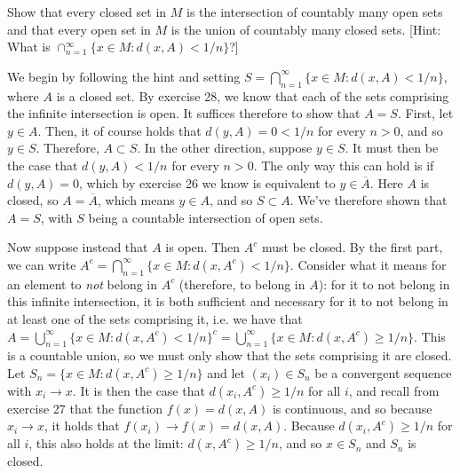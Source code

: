 \begin{exercise}{29}
    Show that every closed set in $M$ is the intersection of countably many open sets and that every open set in $M$ is the union of countably many closed sets.
    [Hint: What is $\cap_{n=1}^{\infty} \{x \in M : d(x, A) < 1/n\}$?]
\end{exercise}

\begin{solution}
    
    We begin by following the hint and setting $S = \bigcap_{n=1}^{\infty} \{x \in M : d(x, A) < 1/n\}$, where $A$ is a closed set.
    By exercise 28, we know that each of the sets comprising the infinite intersection is open.
    It suffices therefore to show that $A = S$.
    First, let $y \in A$.
    Then, it of course holds that $d(y, A) = 0 < 1/n$ for every $n > 0$, and so $y \in S$.
    Therefore, $A \subset S$.
    In the other direction, suppose $y \in S$.
    It must then be the case that $d(y, A) < 1/n$ for every $n > 0$.
    The only way this can hold is if $d(y, A) = 0$, which by exercise 26 we know is equivalent to $y \in \overline{A}$.
    Here $A$ is closed, so $A = \overline{A}$, which means $y \in A$, and so $S \subset A$.
    We've therefore shown that $A = S$, with $S$ being a countable intersection of open sets.

    Now suppose instead that $A$ is open.
    Then $A^c$ must be closed.
    By the first part, we can write $A^c = \bigcap_{n=1}^{\infty}\{x \in M : d(x, A^c) < 1/n \}$.
    Consider what it means for an element to \textit{not} belong in $A^c$ (therefore, to belong in $A$): for it to not belong in this infinite intersection, it is both sufficient and necessary for it to not belong in at least one of the sets comprising it, i.e. we have that $A = \bigcup_{n=1}^{\infty}\{x \in M : d(x, A^c) < 1/n\}^c = \bigcup_{n=1}^{\infty}\{x \in M : d(x, A^c) \geq 1/n\}$.
    This is a countable union, so we must only show that the sets comprising it are closed.
    Let $S_n = \{x \in M : d(x, A^c) \geq 1/n\}$ and let $(x_i) \in S_n$ be a convergent sequence with $x_i \rightarrow x$.
    It is then the case that $d(x_i, A^c) \geq 1/n$ for all $i$, and recall from exercise 27 that the function $f(x) = d(x, A)$ is continuous, and so because $x_i \rightarrow x$, it holds that $f(x_i) \rightarrow f(x) = d(x, A)$. Because $d(x_i, A^c) \geq 1/n$ for all $i$, this also holds at the limit: $d(x, A^c) \geq 1/n$, and so $x \in S_n$ and $S_n$ is closed.
\end{solution}


